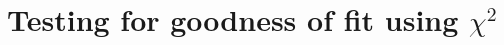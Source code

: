 %
%
%
%
%



\section{Testing for goodness of fit using \texorpdfstring{$\chi^2$}{chi-square}}
\label{oneWayChiSquare}


